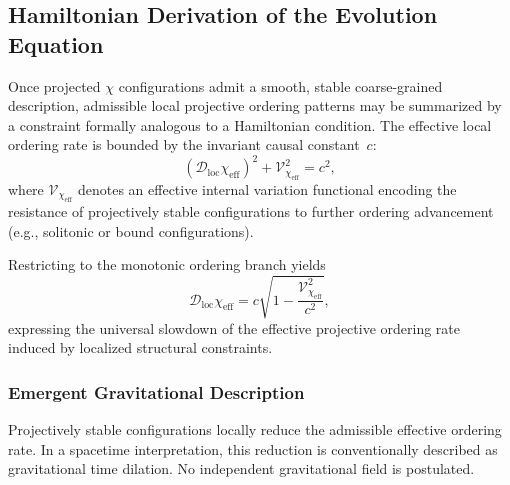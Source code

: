 \subsection{Hamiltonian Derivation of the Evolution Equation}
  \label{subsec:hamiltonian-derivation}

  Once projected $\chi$ configurations admit a smooth, stable coarse-grained
  description, admissible local projective ordering patterns may be summarized
  by a constraint formally analogous to a Hamiltonian condition.
  The effective local ordering rate is bounded by the invariant causal
  constant~$c$:
  \begin{equation}
    \left(\mathcal{D}_{\mathrm{loc}} \chi_{\mathrm{eff}}\right)^2
    + \mathcal{V}_{\chi_{\mathrm{eff}}}^2
    = c^2 ,
    \label{eq:effective_hamiltonian_constraint}
  \end{equation}
  where $\mathcal{V}_{\chi_{\mathrm{eff}}}$ denotes an effective internal
  variation functional encoding the resistance of projectively stable
  configurations to further ordering advancement (e.g., solitonic or
  bound configurations).

  Restricting to the monotonic ordering branch yields
  \begin{equation}
    \mathcal{D}_{\mathrm{loc}} \chi_{\mathrm{eff}}
    = c \sqrt{1
    - \frac{\mathcal{V}_{\chi_{\mathrm{eff}}}^2}{c^2}} ,
    \label{eq:chi_dynamics}
  \end{equation}
  expressing the universal slowdown of the effective projective ordering rate
  induced by localized structural constraints.

  \subsubsection*{Emergent Gravitational Description}

    Projectively stable configurations locally reduce the admissible effective
    ordering rate.
    In a spacetime interpretation, this reduction is conventionally described as
    gravitational time dilation.
    No independent gravitational field is postulated.

